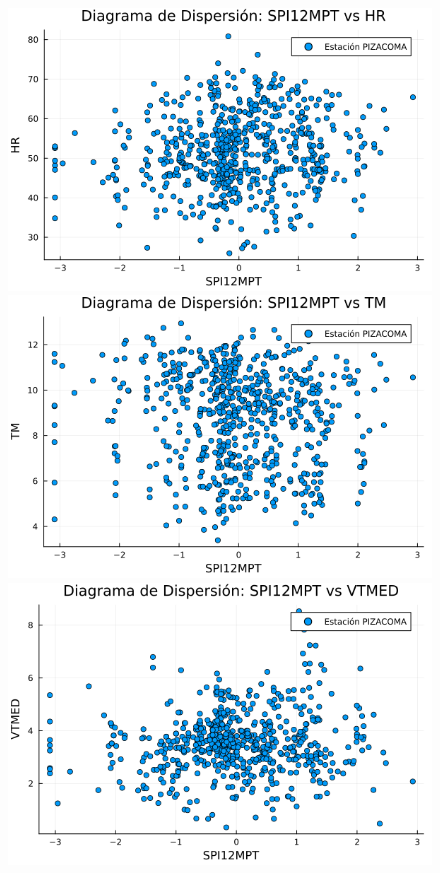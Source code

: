\begin{figure}[htbp]
\begin{minipage}{0.32\textwidth}
    \centering
    \includegraphics[width=\linewidth]{Capitulos/Scaterplot/PIZACOMA_SPI12MPT_vs_HR.png}
\end{minipage}\hfill
\begin{minipage}{0.32\textwidth}
    \centering
    \includegraphics[width=\linewidth]{Capitulos/Scaterplot/PIZACOMA_SPI12MPT_vs_TM.png}
\end{minipage}\hfill
\begin{minipage}{0.32\textwidth}
    \centering
    \includegraphics[width=\linewidth]{Capitulos/Scaterplot/PIZACOMA_SPI12MPT_vs_VTMED.png}
\end{minipage}


\end{figure}
